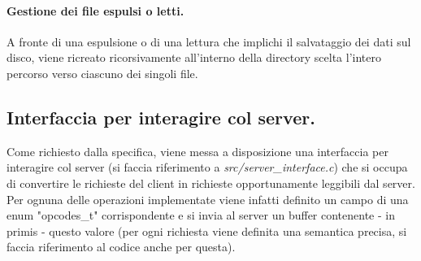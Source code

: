 \documentclass[11pt, italian, openany]{book}
\begin{document}
\begin{sloppypar}
\paragraph{Gestione dei file espulsi o letti.}
A fronte di una espulsione o di una lettura che implichi il salvataggio dei dati sul disco, viene ricreato ricorsivamente all'interno
della directory scelta l'intero percorso verso ciascuno dei singoli file.

\subsection{Interfaccia per interagire col server.}
Come richiesto dalla specifica, viene messa a disposizione una interfaccia per interagire col server (si faccia riferimento a 
\textit{src/server\_interface.c}) che si occupa di convertire le richieste del client in richieste opportunamente leggibili dal server.
Per ognuna delle operazioni implementate viene infatti definito un campo di una enum "opcodes\_t" corrispondente e si invia
al server un buffer contenente - in primis - questo valore (per ogni richiesta viene definita una semantica precisa, si faccia riferimento
al codice anche per questa).

\pagebreak
\end{sloppypar}
\end{document}
